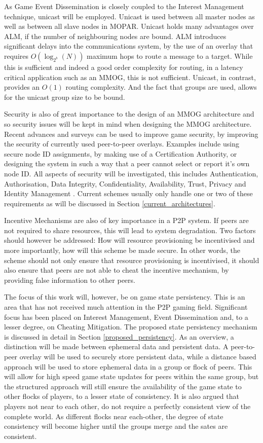\documentclass[journal,oneside,a4paper,onecolumn]{IEEEtran}
\begin{document}
As Game Event Dissemination is closely coupled to the Interest Management technique, unicast will be employed. Unicast is used between all master nodes as well as between all slave nodes in MOPAR. Unicast holds many advantages over ALM, if the number of neighbouring nodes are bound. ALM introduces significant delays into the communications system, by the use of an overlay that requires $O(\log_{2^b}(N))$ maximum hops to route a message to a target. While this is sufficient and indeed a good order complexity for routing, in a latency critical application such as an MMOG, this is not sufficient. Unicast, in contrast, provides an $O(1)$ routing complexity. And the fact that groups are used, allows for the unicast group size to be bound.

Security is also of great importance to the design of an MMOG architecture and so security issues will be kept in mind when designing the MMOG architecture. Recent advances and surveys can be used to improve game security, by improving the security of currently used peer-to-peer overlays. Examples include using secure node ID assignments, by making use of a Certification Authority, or designing the system in such a way that a peer cannot select or report it's own node ID. All aspects of security will be investigated, this includes Authentication, Authorisation, Data Integrity, Confidentiality, Availability, Trust, Privacy and Identity Management \cite{distributed_systems_security}. Current schemes usually only handle one or two of these requirements as will be discussed in Section \ref{current_architectures}.

Incentive Mechanisms are also of key importance in a P2P system. If peers are not required to share resources, this will lead to system degradation. Two factors should however be addressed: How will resource provisioning be incentivised and more importantly, how will this scheme be made secure. In other words, the scheme should not only ensure that resource provisioning is incentivised, it should also ensure that peers are not able to cheat the incentive mechanism, by providing false information to other peers.

The focus of this work will, however, be on game state persistency. This is an area that has not received much attention in the P2P gaming field. Significant focus has been placed on Interest Management, Event Dissemination and, to a lesser degree, on Cheating Mitigation. The proposed state persistency mechanism is discussed in detail in Section \ref{proposed_persistency}. As an overview, a distinction will be made between ephemeral data and persistent data. A peer-to-peer overlay will be used to securely store persistent data, while a distance based approach will be used to store ephemeral data in a group or flock of peers. This will allow for high speed game state updates for peers within the same group, but the structured approach will still ensure the availability of the game state to other flocks of players, to a lesser state of consistency. It is also argued that players not near to each other, do not require a perfectly consistent view of the complete world. As different flocks near each-other, the degree of state consistency will become higher until the groups merge and the sates are consistent.
\end{document}
